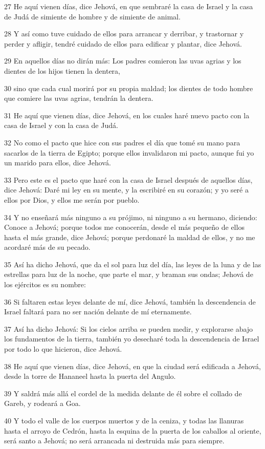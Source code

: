 \par 27 He aquí vienen días, dice Jehová, en que sembraré la casa de Israel y la casa de Judá de simiente de hombre y de simiente de animal.
\par 28 Y así como tuve cuidado de ellos para arrancar y derribar, y trastornar y perder y afligir, tendré cuidado de ellos para edificar y plantar, dice Jehová.
\par 29 En aquellos días no dirán más: Los padres comieron las uvas agrias y los dientes de los hijos tienen la dentera, 
\par 30 sino que cada cual morirá por su propia maldad; los dientes de todo hombre que comiere las uvas agrias, tendrán la dentera.
\par 31 He aquí que vienen días, dice Jehová, en los cuales haré nuevo pacto con la casa de Israel y con la casa de Judá.
\par 32 No como el pacto que hice con sus padres el día que tomé su mano para sacarlos de la tierra de Egipto; porque ellos invalidaron mi pacto, aunque fui yo un marido para ellos, dice Jehová.
\par 33 Pero este es el pacto que haré con la casa de Israel después de aquellos días, dice Jehová: Daré mi ley en su mente, y la escribiré en su corazón; y yo seré a ellos por Dios, y ellos me serán por pueblo.
\par 34 Y no enseñará más ninguno a su prójimo, ni ninguno a su hermano, diciendo: Conoce a Jehová; porque todos me conocerán, desde el más pequeño de ellos hasta el más grande, dice Jehová; porque perdonaré la maldad de ellos, y no me acordaré más de su pecado. 
\par 35 Así ha dicho Jehová, que da el sol para luz del día, las leyes de la luna y de las estrellas para luz de la noche, que parte el mar, y braman sus ondas; Jehová de los ejércitos es su nombre:
\par 36 Si faltaren estas leyes delante de mí, dice Jehová, también la descendencia de Israel faltará para no ser nación delante de mí eternamente.
\par 37 Así ha dicho Jehová: Si los cielos arriba se pueden medir, y explorarse abajo los fundamentos de la tierra, también yo desecharé toda la descendencia de Israel por todo lo que hicieron, dice Jehová.
\par 38 He aquí que vienen días, dice Jehová, en que la ciudad será edificada a Jehová, desde la torre de Hananeel hasta la puerta del Angulo.
\par 39 Y saldrá más allá el cordel de la medida delante de él sobre el collado de Gareb, y rodeará a Goa.
\par 40 Y todo el valle de los cuerpos muertos y de la ceniza, y todas las llanuras hasta el arroyo de Cedrón, hasta la esquina de la puerta de los caballos al oriente, será santo a Jehová; no será arrancada ni destruida más para siempre.

